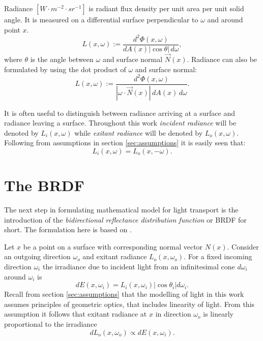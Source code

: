 \begin{df}
Radiance $[W \cdot m^{-2} \cdot sr^{-1}]$ is radiant flux density per unit area per unit solid angle. It is measured on a differential surface perpendicular to $\omega$ and around point $x$.
\begin{equation}
  L(x,\omega) := \frac{d^{2}\Phi(x, \omega)}{dA(x) |\cos\theta| \,d\omega},
\end{equation}
where $\theta$ is the angle between $\omega$ and surface normal $\vec{N}(x)$. Radiance can also be formulated by using the dot product of $\omega$ and surface normal:
\begin{equation}
  L(x, \omega) := \frac{d^{2}\Phi(x, \omega)}{|\omega \cdot \vec{N}(x)| \,dA(x) \,d\omega}.
\end{equation}
\end{df}

It is often useful to distinguish between radiance arriving at a surface and radiance leaving a surface. Throughout this work \emph{incident radiance} will be denoted by $L_{i}(x, \omega)$ while \emph{exitant radiance} will be denoted by $L_{o}(x, \omega)$. Following from assumptions in section \ref{sec:assumptions} it is easily seen that:
\begin{equation}
  L_{i}(x, \omega) = L_{o}(x, -\omega).
\end{equation}

\section{The BRDF}
The next step in formulating mathematical model for light transport is the introduction of the \emph{bidirectional reflectance distribution function} or BRDF for short. The formulation here is based on \cite{veach97}.

Let $x$ be a point on a surface with corresponding normal vector $N(x)$. Consider an outgoing direction $\omega_{o}$ and exitant radiance $L_{o}(x, \omega_{o})$. For a fixed incoming direction $\omega_{i}$ the irradiance due to incident light from an infinitesimal cone $d\omega_{i}$ around $\omega_{i}$ is
\begin{equation}
  dE(x, \omega_{i}) = L_{i}(x, \omega_{i}) |\cos\theta_{i}| d\omega_{i}.
\end{equation}
Recall from section \ref{sec:assumptions} that the modelling of light in this work assumes principles of geometric optics, that includes linearity of light. From this assumption it follows that exitant radiance at $x$ in direction $\omega_{o}$ is linearly proportional to the irradiance
\begin{equation}
  dL_{o}(x, \omega_{o}) \propto dE(x, \omega_{i}).
\end{equation}

